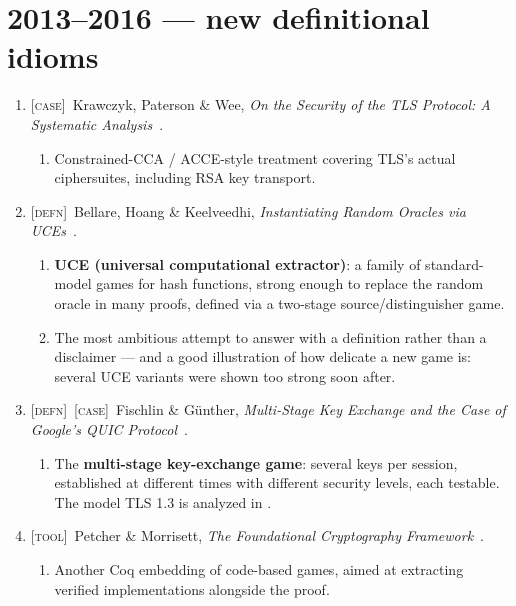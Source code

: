 \documentclass[11pt]{article}
\newcommand{\kind}[1]{{\footnotesize\textsc{\textcolor{yearcolor}{[#1]}}}\ }
\newcommand{\defn}{\kind{defn}}
\newcommand{\tool}{\kind{tool}}
\newcommand{\case}{\kind{case}}
\newcommand{\paper}[3]{#1, \emph{#2}~\cite{#3}.}
\begin{document}
\section{2013--2016 --- new definitional idioms}

\begin{enumerate}
  \item \case \paper{Krawczyk, Paterson \& Wee}{On the Security of the TLS
    Protocol: A Systematic Analysis}{KPW13}
    \begin{enumerate}
      \item Constrained-CCA / ACCE-style treatment covering TLS's actual
        ciphersuites, including RSA key transport.
    \end{enumerate}

  \item \defn \paper{Bellare, Hoang \& Keelveedhi}{Instantiating Random Oracles
    via UCEs}{BHK13}
    \begin{enumerate}
      \item \textbf{UCE (universal computational extractor)}: a family of
        standard-model games for hash functions, strong enough to replace the
        random oracle in many proofs, defined via a two-stage
        source/distinguisher game.
      \item The most ambitious attempt to answer \cite{CGH04} with a definition
        rather than a disclaimer --- and a good illustration of how delicate a
        new game is: several UCE variants were shown too strong soon after.
    \end{enumerate}

  \item \defn\case \paper{Fischlin \& Günther}{Multi-Stage Key Exchange and the
    Case of Google's QUIC Protocol}{FG14}
    \begin{enumerate}
      \item The \textbf{multi-stage key-exchange game}: several keys per
        session, established at different times with different security levels,
        each testable. The model TLS 1.3 is analyzed in \cite{DFGS21}.
    \end{enumerate}

  \item \tool \paper{Petcher \& Morrisett}{The Foundational Cryptography
    Framework}{FCF15}
    \begin{enumerate}
      \item Another Coq embedding of code-based games, aimed at extracting
        verified implementations alongside the proof.
    \end{enumerate}


\end{enumerate}
\end{document}
